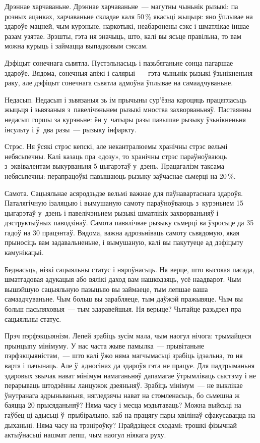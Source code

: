 Дрэннае харчаваньне. Дрэннае харчаваньне~--- магутны чыньнік рызыкі: па розных ацэнках, харчаваньне складае каля 50\,\% якасьці жыцьця: яно ўплывае на здароўе мацней, чым курэньне, наркотыкі, неабаронены сэкс і шматлікае іншае разам узятае. Зрэшты, гэта ня значыць, што, калі вы ясьце правільна, то вам можна курыць і займацца выпадковым сэксам.

Дэфіцыт сонечнага сьвятла. Пустэльнасьць і пазьбяганьне сонца пагаршае здароўе. Вядома, сонечныя апёкі і салярыі~--- гэта чыньнік рызыкі ўзьнікненьня раку, але дэфіцыт сонечнага сьвятла адмоўна ўплывае на самаадчуваньне.

Недасып. Недасып і зьвязаныя зь ім прычыны сур'ёзна кароцяць працягласьць жыцьця і зьвязаныя з~павелічэньнем рызыкі мноства захворваньняў. Пастаянны недасып горшы за курэньне: ён у~чатыры разы павышае рызыку ўзьнікненьня інсульту і ў~два разы~--- рызыку інфаркту.

Стрэс. Ня ўсякі стрэс кепскі, але некантралюемы хранічны стрэс вельмі небясьпечны. Калі казаць пра «дозу», то хранічны стрэс параўноўваюць з~эквівалентам выкурваньня 5 цыгарэтаў у~дзень. Працагалізм таксама небясьпечны: перапрацоўкі павышаюць рызыку заўчаснае сьмерці на 20\,\%.

Самота. Сацыяльнае асяродзьдзе вельмі важнае для паўнавартаснага здароўя. Паталягічную ізаляцыю і вымушаную самоту параўноўваюць з~курэньнем 15 цыгарэтаў у~дзень і павелічэньнем рызыкі шматлікіх захворваньняў і дэструктыўных паводзінаў. Самота павялічвае рызыку сьмерці ва ўзросьце да 35 гадоў на 30 працэнтаў. Вядома, важна адрозьніваць самоту сьвядомую, якая прыносіць вам задавальненьне, і вымушаную, калі вы пакутуеце ад дэфіцыту камунікацыі.

Беднасьць, нізкі сацыяльны статус і няроўнасьць. Ня верце, што высокая пасада, шматгадовая адукацыя або вялікі даход вам нашкодзяць, усё наадварот. Чым вышэйшую сацыяльную пазыцыю вы займаеце, тым лепшае ваша самаадчуваньне. Чым больш вы зарабляеце, тым даўжэй пражывяце. Чым вы больш пасьпяховыя~--- тым здаравейшыя. Ня верыце? Чытайце разьдзел пра сацыяльны статус.

Прэч пэрфэкцыянізм. Лепей зрабіць зусім мала, чым наогул нічога: трымайцеся прынцыпу мінімуму. У нас часта жыве памылка~--- прывітаньне пэрфэкцыяністам,~--- што калі ўжо няма магчымасьці зрабіць ідэальна, то ня варта і пачынаць. Але ў~адносінах да здароўя гэта не працуе. Для падтрыманьня здаровых звычак нават мінімум намаганьняў дапамагае ўтрымліваць сыстэму і не перарываць штодзённы ланцужок дзеяньняў. Зрабіць мінімум~--- не выклікае ўнутранага адрыньваньня, нягледзячы нават на стомленасьць, бо сьмешна ж баяцца 20 прысяданьняў? Няма часу і месца мэдытаваць? Можна выйсьці на гаўбец ці адысьці ў~прыбіральню, каб на працягу пары хвілінаў сфакусавацца на дыханьні. Няма часу на трэніроўку? Прайдзіцеся сходамі: трошкі фізычнай актыўнасьці нашмат лепш, чым наогул ніякага руху.

